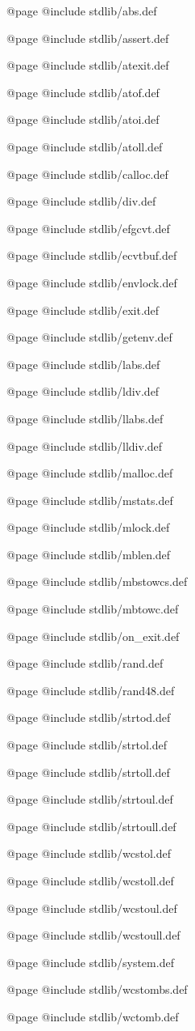 @page
@include stdlib/abs.def

@page
@include stdlib/assert.def

@page
@include stdlib/atexit.def

@page
@include stdlib/atof.def

@page
@include stdlib/atoi.def

@page
@include stdlib/atoll.def

@page
@include stdlib/calloc.def

@page
@include stdlib/div.def

@page
@include stdlib/efgcvt.def

@page
@include stdlib/ecvtbuf.def

@page
@include stdlib/envlock.def

@page
@include stdlib/exit.def

@page
@include stdlib/getenv.def

@page
@include stdlib/labs.def

@page
@include stdlib/ldiv.def

@page
@include stdlib/llabs.def

@page
@include stdlib/lldiv.def

@page
@include stdlib/malloc.def

@page
@include stdlib/mstats.def

@page
@include stdlib/mlock.def

@page
@include stdlib/mblen.def

@page
@include stdlib/mbstowcs.def

@page
@include stdlib/mbtowc.def

@page
@include stdlib/on_exit.def

@page
@include stdlib/rand.def

@page
@include stdlib/rand48.def

@page
@include stdlib/strtod.def

@page
@include stdlib/strtol.def

@page
@include stdlib/strtoll.def

@page
@include stdlib/strtoul.def

@page
@include stdlib/strtoull.def

@page
@include stdlib/wcstol.def

@page
@include stdlib/wcstoll.def

@page
@include stdlib/wcstoul.def

@page
@include stdlib/wcstoull.def

@page
@include stdlib/system.def

@page
@include stdlib/wcstombs.def

@page
@include stdlib/wctomb.def

